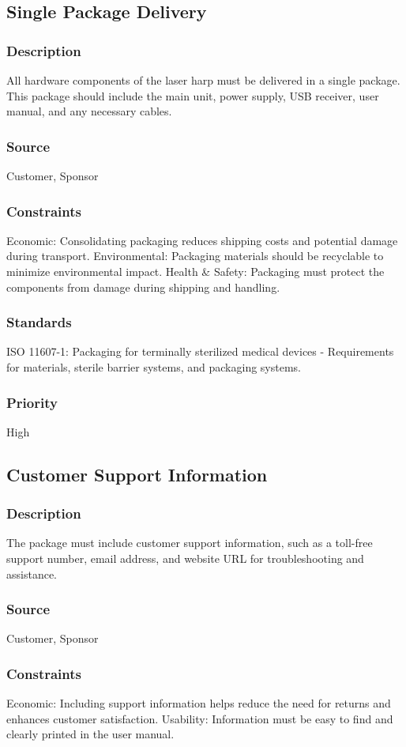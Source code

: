 \subsection{Single Package Delivery}
\subsubsection{Description}
All hardware components of the laser harp must be delivered in a single package. This package should include the main unit, power supply, USB receiver, user manual, and any necessary cables.
\subsubsection{Source}
Customer, Sponsor
\subsubsection{Constraints}
Economic: Consolidating packaging reduces shipping costs and potential damage during transport.
Environmental: Packaging materials should be recyclable to minimize environmental impact.
Health & Safety: Packaging must protect the components from damage during shipping and handling.
\subsubsection{Standards}
ISO 11607-1: Packaging for terminally sterilized medical devices - Requirements for materials, sterile barrier systems, and packaging systems.
\subsubsection{Priority}
High


\subsection{Customer Support Information}
\subsubsection{Description}
The package must include customer support information, such as a toll-free support number, email address, and website URL for troubleshooting and assistance.
\subsubsection{Source}
Customer, Sponsor
\subsubsection{Constraints}
Economic: Including support information helps reduce the need for returns and enhances customer satisfaction.
Usability: Information must be easy to find and clearly printed in the user manual.
